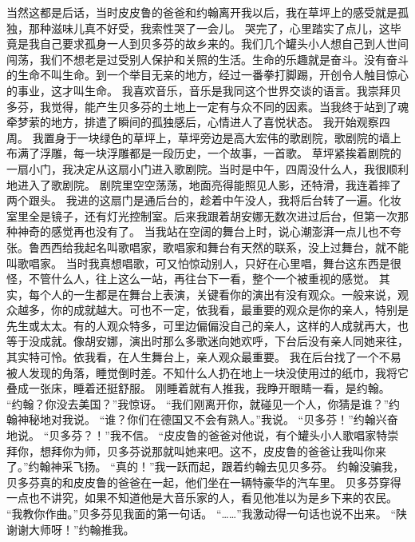\documentclass[a4paper,12pt,UTF8,twoside]{ctexbook}
\begin{document}
        当然这都是后话，当时皮皮鲁的爸爸和约翰离开我以后，我在草坪上的感受就是孤独，那种滋味儿真不好受，我索性哭了一会儿。 
        哭完了，心里踏实了点儿，这毕竟是我自己要求孤身一人到贝多芬的故乡来的。我们几个罐头小人想自己到人世间闯荡，我们不想老是过受别人保护和关照的生活。生命的乐趣就是奋斗。没有奋斗的生命不叫生命。到一个举目无亲的地方，经过一番拳打脚踢，开创令人触目惊心的事业，这才叫生命。 
        我喜欢音乐，音乐是我同这个世界交谈的语言。我崇拜贝多芬，我觉得，能产生贝多芬的土地上一定有与众不同的因素。当我终于站到了魂牵梦萦的地方，排遣了瞬间的孤独感后，心情进人了喜悦状态。 
        我开始观察四周。 
        我置身于一块绿色的草坪上，草坪旁边是高大宏伟的歌剧院，歌剧院的墙上布满了浮雕，每一块浮雕都是一段历史，一个故事，一首歌。 
        草坪紧挨着剧院的一扇小门，我决定从这扇小门进入歌剧院。当时是中午，四周没什么人，我很顺利地进入了歌剧院。 
        剧院里空空荡荡，地面亮得能照见人影，还特滑，我连着摔了两个跟头。 
        我进的这扇门是通后台的，趁着中午没人，我将后台转了一遍。化妆室里全是镜子，还有灯光控制室。后来我跟着胡安娜无数次进过后台，但第一次那种神奇的感觉再也没有了。 
        当我站在空阔的舞台上时，说心潮澎湃一点儿也不夸张。鲁西西给我起名叫歌唱家，歌唱家和舞台有天然的联系，没上过舞台，就不能叫歌唱家。 
        当时我真想唱歌，可又怕惊动别人，只好在心里唱，舞台这东西是很怪，不管什么人，往上这么一站，再往台下一看，整个一个被重视的感觉。 
        其实，每个人的一生都是在舞台上表演，关键看你的演出有没有观众。一般来说，观众越多，你的成就越大。可也不一定，依我看，最重要的观众是你的亲人，特别是先生或太太。有的人观众特多，可里边偏偏没自己的亲人，这样的人成就再大，也等于没成就。像胡安娜，演出时那么多歌迷向她欢呼，下台后没有亲人同她来往，其实特可怜。依我看，在人生舞台上，亲人观众最重要。 
        我在后台找了一个不易被人发现的角落，睡觉倒时差。不知什么人扔在地上一块没使用过的纸巾，我将它叠成一张床，睡着还挺舒服。 
        刚睡着就有人推我，我睁开眼睛一看，是约翰。 
        “约翰？你没去美国？”我惊讶。 
        “我们刚离开你，就碰见一个人，你猜是谁？”约翰神秘地对我说。 
        “谁？你们在德国又不会有熟人。”我说。 
        “贝多芬！”约翰兴奋地说。 
        “贝多芬？！”我不信。 
        “皮皮鲁的爸爸对他说，有个罐头小人歌唱家特崇拜你，想拜你为师，贝多芬说那就叫她来吧。这不，皮皮鲁的爸爸让我叫你来了。”约翰神采飞扬。 
        “真的！”我一跃而起，跟着约翰去见贝多芬。 
        约翰没骗我，贝多芬真的和皮皮鲁的爸爸在一起，他们坐在一辆特豪华的汽车里。 
        贝多芬穿得一点也不讲究，如果不知道他是大音乐家的人，看见他准以为是乡下来的农民。 
        “我教你作曲。”贝多芬见我面的第一句话。 
        “……”我激动得一句话也说不出来。 
        “陕谢谢大师呀！”约翰推我。 
\end{document}
